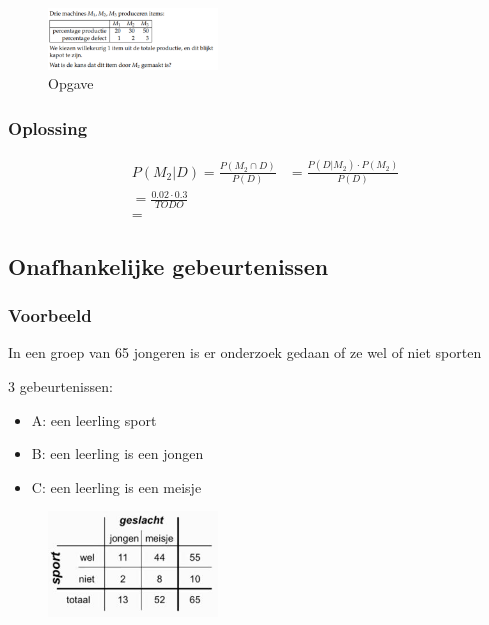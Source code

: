 \documentclass{article}
\begin{document}
\begin{figure}[H]
    \centering
    \includegraphics[width=0.4\textwidth]{voorwaardelijke-kans-oef2.png}
    \caption{Opgave}
\end{figure}

\subsubsection{Oplossing}

\begin{center}
    \begin{align}
        & P(M_2 | D) = \frac{P(M_2 \cap D)}{P(D)} & = \frac{P(D | M_2) \cdot P(M_2)}{P(D)}\\
        & = \frac{0.02 \cdot 0.3}{TODO}\\
        & = 
    \end{align}
\end{center}

\subsection{Onafhankelijke gebeurtenissen}

\subsubsection{Voorbeeld}

In een groep van 65 jongeren is er onderzoek gedaan of ze wel of niet sporten

3 gebeurtenissen:

\begin{itemize}
    \item A: een leerling sport
    \item B: een leerling is een jongen
    \item C: een leerling is een meisje
\end{itemize}

\begin{figure}[H]
    \centering
    \includegraphics[width=0.4\textwidth]{voorwaardelijke-kans-sport2.png}
\end{figure}
\end{document}
